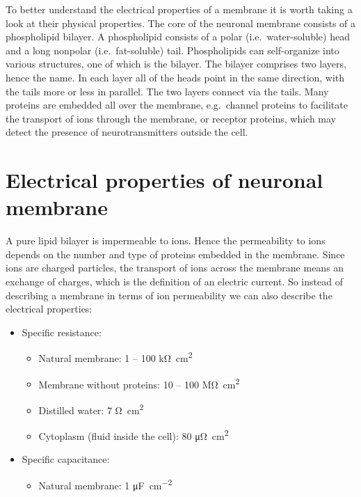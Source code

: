 To better understand the electrical properties of a membrane it is worth taking a look at their physical properties. The core of the neuronal membrane consists of a phospholipid bilayer. A phospholipid consists of a polar (i.e.\ water-soluble) head and a long nonpolar (i.e.\ fat-soluble) tail. Phospholipids can self-organize into various structures, one of which is the bilayer. The bilayer comprises two layers, hence the name. In each layer all of the heads point in the same direction, with the tails more or less in parallel. The two layers connect via the tails. Many proteins are embedded all over the membrane, e.g.\ channel proteins to facilitate the transport of ions through the membrane, or receptor proteins, which may detect the presence of neurotransmitters outside the cell.

\section{Electrical properties of neuronal membrane}

A pure lipid bilayer is impermeable to ions. Hence the permeability to ions depends on the number and type of proteins embedded in the membrane. Since ions are charged particles, the transport of ions across the membrane means an exchange of charges, which is the definition of an electric current. So instead of describing a membrane in terms of ion permeability we can also describe the electrical properties:
\begin{itemize}
\item[] Specific resistance:
\begin{itemize}
\item Natural membrane: 1 -- 100 \si{\kilo\ohm\centi\meter\squared}
\item Membrane without proteins: 10 -- 100 \si{\mega\ohm\centi\meter\squared}
\item Distilled water: 7 \si{\ohm\centi\meter\squared}
\item Cytoplasm (fluid inside the cell): 80 \si{\micro\ohm\centi\meter\squared}
\end{itemize}
\item[] Specific capacitance:
\begin{itemize}
\item Natural membrane: 1 \si{\micro\farad\per\centi\meter\squared}
\end{itemize}
\end{itemize}

